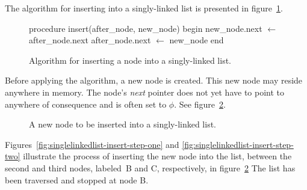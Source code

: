 \documentclass{article}
\begin{document}
  The algorithm for inserting into a singly-linked list is presented in figure~\ref{fig:alg:singlelinkedlist-insert}.
  \begin{figure}[h]
    \begin{algorithm}
      procedure insert(after_node, new_node)
      begin
        new_node.next $\gets$ after_node.next
        after_node.next $\gets$ new_node
      end\end{algorithm}
    \caption{Algorithm for inserting a node into a singly-linked list.}
    \label{fig:alg:singlelinkedlist-insert}
  \end{figure}

  Before applying the algorithm, a new node is created. This new node may reside anywhere in memory. The node's \emph{next} pointer does not yet have to point to anywhere of consequence and is often set to $\phi$. See figure~\ref{fig:singlelinkedlist-newnode}.
  \begin{figure}[h]
    \centering
    \caption{A new node to be inserted into a singly-linked list.}
    \label{fig:singlelinkedlist-newnode}
  \end{figure}

  Figures~\ref{fig:singlelinkedlist-insert-step-one} and \ref{fig:singlelinkedlist-insert-step-two} illustrate the process of inserting the new node into the list, between the second and third nodes, labeled~B and C, respectively, in figure~\ref{fig:singlelinkedlist-newnode} The list has been traversed and stopped at node B.
\end{document}
